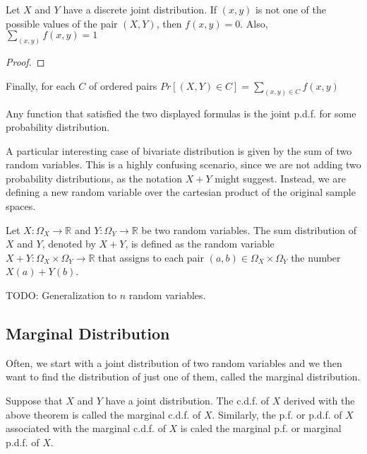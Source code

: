 \begin{proposition}
Let $X$ and $Y$ have a discrete joint distribution. If $\left(x,y\right)$ is not one of the possible values of the pair $\left(X,Y\right)$, then $f\left(x,y\right)=0$. Also, $\sum_{\left(x,y\right)}f\left(x,y\right)=1$
\end{proposition}
\begin{proof}
\end{proof}

Finally, for each $C$ of ordered pairs $Pr\left[\left(X,Y\right)\in C\right]=\sum_{\left(x,y\right)\in C}f\left(x,y\right)$

{\color{red} Any function that satisfied the two displayed formulas is the joint p.d.f. for some probability distribution.}

A particular interesting case of bivariate distribution is given by the sum of two random variables. This is a highly confusing scenario, since we are not adding two probability distributions, as the notation $X + Y$ might suggest. Instead, we are defining a new random variable over the cartesian product of the original sample spaces.

\begin{definition}
Let $X : \Omega_X \rightarrow \mathbb{R}$ and $Y : \Omega_Y \rightarrow \mathbb{R}$ be two random variables. The sum distribution of $X$ and $Y$, denoted by $X + Y$, is defined as the random variable $X + Y : \Omega_X \times \Omega_Y \rightarrow \mathbb{R}$ that assigns to each pair $\left( a, b \right) \in \Omega_X \times \Omega_Y$ the number $X(a) + Y(b)$.
\end{definition}

{\color{red} TODO: Generalization to $n$ random variables.}


\subsection{Marginal Distribution}

{\color{red} Often, we start with a joint distribution of two random variables and we then want to find the distribution of just one of them, called the marginal distribution.}

\begin{definition}
Suppose that $X$ and $Y$ have a joint distribution. The c.d.f. of $X$ derived with the above theorem is called the marginal c.d.f. of $X$. Similarly, the p.f. or p.d.f. of $X$ associated with the marginal c.d.f. of $X$ is caled the marginal p.f. or marginal p.d.f. of $X$.
\end{definition}

